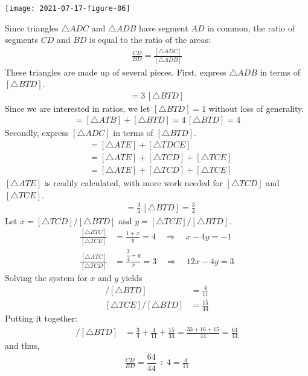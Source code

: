 \documentclass[12pt]{article}
\begin{document}
\bigskip
\begin{center}
  \texttt{[image: 2021-07-17-figure-06]}
\end{center}
\bigskip


\begin{answer}
Since triangles $\triangle ADC$ and $\triangle ADB$ have segment $AD$ in common, the ratio of segments $CD$ and $BD$ is equal to the ratio of the areas:
\begin{align*}
\frac{CD}{BD}
 = \frac{[\triangle ADC]}{[\triangle ADB]}
\end{align*}
These triangles are made up of several pieces. First, express $\triangle ADB$  in terms of $[\triangle BTD]$.
\begin{align*}
[\triangle ATB] = 3 \, [\triangle BTD]
\end{align*}
Since we are interested in ratios, we let $[\triangle BTD] = 1$ without loss of generality. 
\begin{align*}
[\triangle ADB] = [\triangle ATB] + [\triangle BTD] = 4 \, [\triangle BTD] = 4
\end{align*}
Secondly, express $[\triangle ADC]$ in terms of $[\triangle BTD]$.
\begin{align*}
[\triangle ADC] 
  & = [\triangle ATE] + [\triangle TDCE] \\
  & = [\triangle ATE] + [\triangle TCD] + [\triangle TCE] \\
  & = [\triangle ATE] + [\triangle TCD] + [\triangle TCE]
\end{align*}
$[\triangle ATE]$ is readily calculated, with more work needed for $[\triangle TCD]$ and $[\triangle TCE]$.
\begin{align*}
[\triangle ATE] & = \frac{3}{4} \, [\triangle BTD] = \frac{3}{4}
\end{align*}
Let $x = [\triangle TCD]/[\triangle BTD]$ and $y = [\triangle TCE]/[\triangle BTD]$. 
\begin{align*}
\frac{[\triangle BTC]}{[\triangle TCE]} 
 & = \frac{1+x}{y}  = 4 
\quad\Rightarrow\quad 
 x - 4y = -1 \\
\frac{[\triangle ATC]}{[\triangle TCD]} 
 & = \frac{\dfrac{3}{4}+y}{x} = 3
\quad\Rightarrow\quad 
 12x - 4y = 3
\end{align*}
Solving the system for $x$ and $y$ yields
\begin{align*}
[\triangle TCD] / [\triangle BTD] & = \frac{4}{11} \\[1ex]
[\triangle TCE] / [\triangle BTD] & = \frac{15}{44}
\end{align*}
Putting it together:
\begin{align*}
[\triangle ADC] / [\triangle BTD] 
  & = \frac{3}{4} + \frac{4}{11} + \frac{15}{44}
    = \frac{33+16+15}{44}
    = \frac{64}{44}
\end{align*}
and thus,
\begin{align*}
\frac{CD}{BD} 
  = \dfrac{64}{44} \div 4
  = \frac{4}{11}
\end{align*}


\end{answer}
\end{document}
